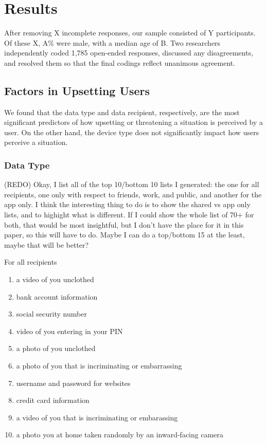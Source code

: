\documentclass{acm_proc_article-sp}
\begin{document}

\section{Results}
After removing X incomplete responses, our sample consisted of Y participants. Of these X, A\% were male, with a median age of B. Two researchers independently coded 1,785 open-ended responses, discussed any disagreements, and resolved them so that the final codings reflect unanimous agreement. 

\subsection{Factors in Upsetting Users}
We found that the data type and data recipient, respectively, are the most significant predictors of how upsetting or threatening a situation is perceived by a user. On the other hand, the device type does not significantly impact how users perceive a situation.

\subsubsection{Data Type}
(REDO) Okay, I list all of the top 10/bottom 10 lists I generated: the one for all recipients, one only with respect to friends, work, and public, and another for the app only. I think the interesting thing to do is to show the shared vs app only lists, and to highight what is different. If I could show the whole list of 70+ for both, that would be most insightful, but I don't have the place for it in this paper, so this will have to do. Maybe I can do a top/bottom 15 at the least, maybe that will be better? 

For all recipients \\[-.8cm]

\begin{enumerate} \itemsep1pt \parskip0pt 
  \item a video of you unclothed
  \item bank account information
  \item social security number
  \item video of you entering in your PIN
  \item a photo of you unclothed
  \item a photo of you that is incriminating or embarrassing
  \item username and password for websites
  \item credit card information
  \item a video of you that is incriminating or embarassing
  \item a photo you at home taken randomly by an inward-facing camera \\[-.8cm]
\end{enumerate}
\end{document}
